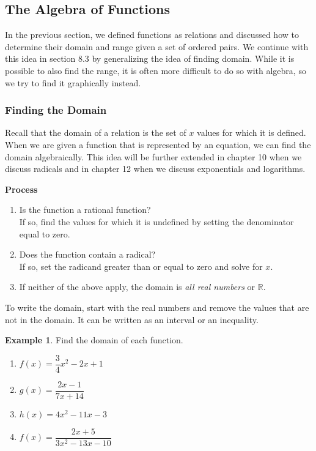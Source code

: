 \documentclass[addpoints,12pt]{exam}
\theoremstyle{definition}
\newtheorem{example}{Example}[subsection]
\begin{document}
\setcounter{section}{8}
\setcounter{subsection}{2}

\subsection{The Algebra of Functions}

In the previous section, we defined functions as relations and discussed how to determine their domain and range given a set of ordered pairs. We continue with this idea in section 8.3 by generalizing the idea of finding domain. While it is possible to also find the range, it is often more difficult to do so with algebra, so we try to find it graphically instead.

\subsubsection*{Finding the Domain}
Recall that the domain of a relation is the set of $x$ values for which it is defined. When we are given a function that is represented by an equation, we can find the domain algebraically. This idea will be further extended in chapter 10 when we discuss radicals and in chapter 12 when we discuss exponentials and logarithms.

\begin{mdframed}
\textbf{Process}
\begin{enumerate}
\item Is the function a rational function?\\If so, find the values for which it is undefined by setting the denominator equal to zero.
\item Does the function contain a radical?\\If so, set the radicand greater than or equal to zero and solve for $x$.
\item If neither of the above apply, the domain is \emph{all real numbers} or $\mathbb{R}$.
\end{enumerate}

To write the domain, start with the real numbers and remove the values that are not in the domain. It can be written as an interval or an inequality.
\end{mdframed}

\vspace{.1in}

\begin{example}
Find the domain of each function.
\begin{enumerate}
\item $f(x) = \dfrac{3}{4}x^2 - 2x + 1$
\vspace{.75in}
\item $g(x) = \dfrac{2x-1}{7x+14}$
\vspace{.75in}
\newpage
\item $h(x) = 4x^2-11x-3$
\vspace{.75in}
\item $f(x) = \dfrac{2x+5}{3x^2-13x-10}$
\vspace{1.25in}
\end{enumerate}
\end{example}
\end{document}

